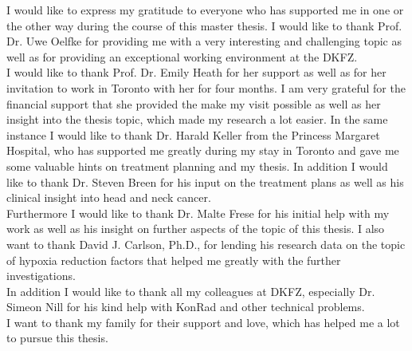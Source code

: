 %
I would like to express my gratitude to everyone who has supported me in one or the other way during the course of this master thesis. I would like to thank Prof. Dr. Uwe Oelfke for providing me with a very interesting and challenging topic as well as for providing an exceptional working environment at the DKFZ.\\I would like to thank Prof. Dr. Emily Heath for her support as well as for her invitation to work in Toronto with her for four months. I am very grateful for the financial support that she provided the make my visit possible as well as her insight into the thesis topic, which made my research a lot easier. In the same instance I would like to thank Dr. Harald Keller from the Princess Margaret Hospital, who has supported me greatly during my stay in Toronto and gave me some valuable hints on treatment planning and my thesis. In addition I would like to thank Dr. Steven Breen for his input on the treatment plans as well as his clinical insight into head and neck cancer.\\Furthermore I would like to thank Dr. Malte Frese for his initial help with my work as well as his insight on further aspects of the topic of this thesis. I also want to thank David J. Carlson, Ph.D., for lending his research data on the topic of hypoxia reduction factors that helped me greatly with the further investigations.\\In addition I would like to thank all my colleagues at DKFZ, especially Dr. Simeon Nill for his kind help with KonRad and other technical problems.\\I want to thank my family for their support and love, which has helped me a lot to pursue this thesis.